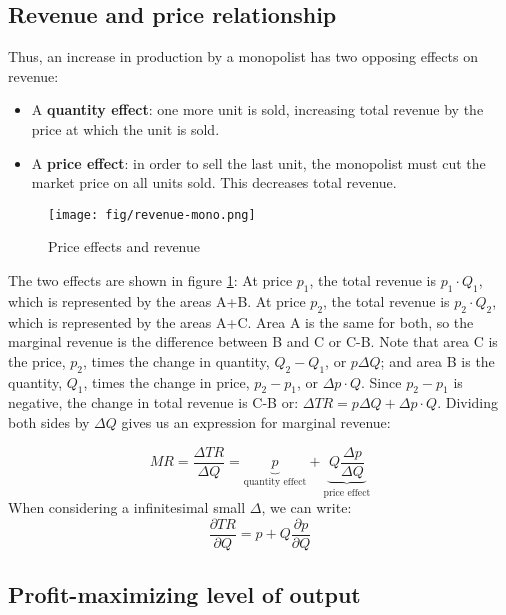 \subsection{Revenue and price relationship}\label{revenue-and-price-relationship}

Thus, an increase in production by a monopolist has two opposing effects on revenue:

\begin{itemize}
	\item
	A \textbf{quantity effect}: one more unit is sold, increasing total revenue by the price at which the unit is sold.
	\item
	A \textbf{price effect}: in order to sell the last unit, the monopolist must cut the market price on all units sold. This decreases total revenue.
\end{itemize}

\begin{figure}
	\centering
	\texttt{[image: fig/revenue-mono.png]}
	\caption{Price effects and revenue}\label{fig:revenue-mono}
\end{figure}

The two effects are shown in figure \ref{fig:revenue-mono}: At price \(p_1\), the total revenue is \(p_1 \cdot Q_1\), which is represented by the areas A+B. At price \(p_2\), the total revenue is \(p_2 \cdot Q_2\), which is represented by the areas A+C. Area A is the same for both, so the marginal revenue is the difference between B and C or C-B. Note that area C is the price, \(p_2\), times the change in quantity, \(Q_2 - Q_1\), or \(p \Delta Q\); and area B is the quantity, \(Q_1\), times the change in price, \(p_2 - p_1\), or \(\Delta p \cdot Q\). Since \(p_2 - p_1\) is negative, the change in total revenue is C-B or: \(\Delta TR = p \Delta Q + \Delta p \cdot Q\). Dividing both sides by \(\Delta Q\) gives us an expression for marginal revenue:

\[
MR = \frac{\Delta TR}{\Delta Q} = \underbrace{p}_{\text{quantity effect}} + \underbrace{Q \frac{\Delta p}{\Delta Q}}_{\text{price effect}}
\]
When considering a infinitesimal small $\Delta$, we can write:
$$
\frac{\partial TR}{\partial Q}=p+Q\frac{\partial p}{\partial Q}
$$
\subsection{Profit-maximizing level of output}\label{profit-maximizing-level-of-output}

